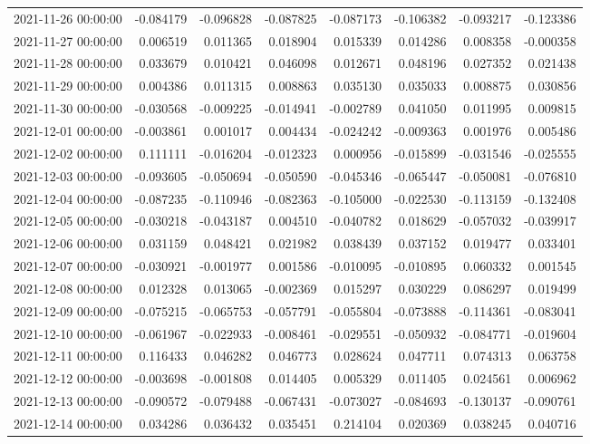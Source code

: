 \begin{tabular}{lrrrrrrr}
2021-11-26 00:00:00 & -0.084179 & -0.096828 & -0.087825 & -0.087173 & -0.106382 & -0.093217 & -0.123386 \\
2021-11-27 00:00:00 & 0.006519 & 0.011365 & 0.018904 & 0.015339 & 0.014286 & 0.008358 & -0.000358 \\
2021-11-28 00:00:00 & 0.033679 & 0.010421 & 0.046098 & 0.012671 & 0.048196 & 0.027352 & 0.021438 \\
2021-11-29 00:00:00 & 0.004386 & 0.011315 & 0.008863 & 0.035130 & 0.035033 & 0.008875 & 0.030856 \\
2021-11-30 00:00:00 & -0.030568 & -0.009225 & -0.014941 & -0.002789 & 0.041050 & 0.011995 & 0.009815 \\
2021-12-01 00:00:00 & -0.003861 & 0.001017 & 0.004434 & -0.024242 & -0.009363 & 0.001976 & 0.005486 \\
2021-12-02 00:00:00 & 0.111111 & -0.016204 & -0.012323 & 0.000956 & -0.015899 & -0.031546 & -0.025555 \\
2021-12-03 00:00:00 & -0.093605 & -0.050694 & -0.050590 & -0.045346 & -0.065447 & -0.050081 & -0.076810 \\
2021-12-04 00:00:00 & -0.087235 & -0.110946 & -0.082363 & -0.105000 & -0.022530 & -0.113159 & -0.132408 \\
2021-12-05 00:00:00 & -0.030218 & -0.043187 & 0.004510 & -0.040782 & 0.018629 & -0.057032 & -0.039917 \\
2021-12-06 00:00:00 & 0.031159 & 0.048421 & 0.021982 & 0.038439 & 0.037152 & 0.019477 & 0.033401 \\
2021-12-07 00:00:00 & -0.030921 & -0.001977 & 0.001586 & -0.010095 & -0.010895 & 0.060332 & 0.001545 \\
2021-12-08 00:00:00 & 0.012328 & 0.013065 & -0.002369 & 0.015297 & 0.030229 & 0.086297 & 0.019499 \\
2021-12-09 00:00:00 & -0.075215 & -0.065753 & -0.057791 & -0.055804 & -0.073888 & -0.114361 & -0.083041 \\
2021-12-10 00:00:00 & -0.061967 & -0.022933 & -0.008461 & -0.029551 & -0.050932 & -0.084771 & -0.019604 \\
2021-12-11 00:00:00 & 0.116433 & 0.046282 & 0.046773 & 0.028624 & 0.047711 & 0.074313 & 0.063758 \\
2021-12-12 00:00:00 & -0.003698 & -0.001808 & 0.014405 & 0.005329 & 0.011405 & 0.024561 & 0.006962 \\
2021-12-13 00:00:00 & -0.090572 & -0.079488 & -0.067431 & -0.073027 & -0.084693 & -0.130137 & -0.090761 \\
2021-12-14 00:00:00 & 0.034286 & 0.036432 & 0.035451 & 0.214104 & 0.020369 & 0.038245 & 0.040716 \\

\end{tabular}
